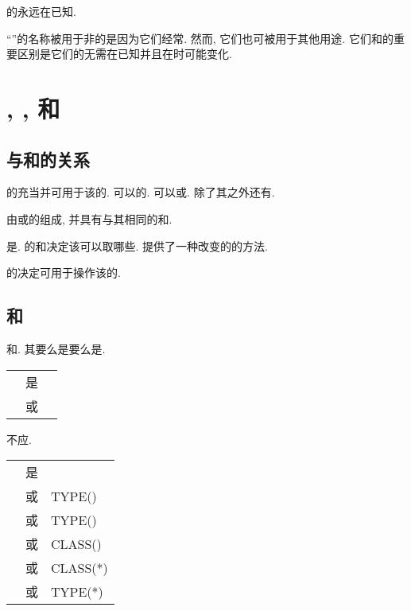 \Kind{}\TypeParameter{}的\Value{}永远在\CompileTime{}已知.

``\Length{}\TypeParameter{}''的名称被用于非\Kind{}\TypeParameter{}的\TypeParameter{}是因为它们经常\Specify{}\Length{}. 然而, 它们也可被用于其他用途. 它们和\Kind{}\TypeParameter{}的重要区别是它们的\Value{}无需在\CompileTime{}已知并且在\Execution{}时可能变化.

\section{\Type{}, \TypeSpecifier{}, 和\Value{}}


\subsection{\Type{}与\Value{}和\Object{}的关系}

\Type{}的\Name{}充当\TypeSpecifier{}并可用于\Declare{}该\Type{}的\Object{}. \Declaration{}可以\Specify{}\Named{}\Object{}的\Type{}. \Data{}\Object{}可以\Explicitly{}或\Implicitly{}\Declare{}. \Data{}\Object{}除了其\Type{}之外还有\Attribute{}.

\Array{}由\IntrinsicType{}或\DerivedType{}的\Scalar{}\Data{}组成, 并具有与其\Element{}相同的\Type{}和\TypeParameter{}.

\Variable{}是\Data{}\Object{}. \Variable{}的\Type{}和\TypeParameter{}决定该\Variable{}可以取哪些\Value{}. \Assignment{}提供了一种改变\Variable{}的\Value{}的方法.

\Variable{}的\Type{}决定可用于操作该\Variable{}的\Operation{}.

\subsection{\TypeSpecifier{}和\Type{}\Compatibility{}}

\TypeSpecifier{}\Specify{}\Type{}和\TypeParameter{}\Value{}. 其要么是\tit{\TypeSpecifier{}}要么是\tit{\Declaration{}\TypeSpecifier{}}.

\begin{tabular}{lll}
    \tit{\TypeSpecifier{}}&是&\tit{\Intrinsic{}\TypeSpecifier{}}\\
    &或&\tit{\Derived{}\TypeSpecifier{}}\\
\end{tabular}

\Derived{}\TypeSpecifier{}不应\Specify{}\AbstractType{}.

\begin{tabular}{lll}
    \tit{\Declaration{}\TypeSpecifier{}}&是&\tit{\Intrinsic{}\TypeSpecifier{}}\\
    &或&TYPE(\tit{\Intrinsic{}\TypeSpecifier{}})\\
    &或&TYPE(\tit{\Derived{}\TypeSpecifier{}})\\
    &或&CLASS(\tit{\Derived{}\TypeSpecifier{}})\\
    &或&CLASS(*)\\
    &或&TYPE(*)\\
\end{tabular}

